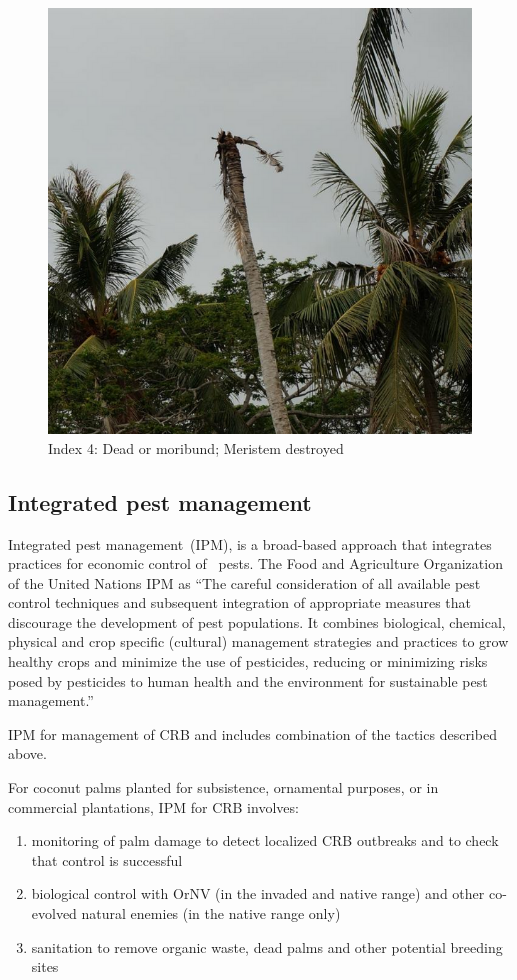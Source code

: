 \documentclass[twocolumn,letterpaper]{scrartcl}
\begin{document}
\begin{figure}[h!]
	\centering
	\includegraphics[width=.8\linewidth]{images/j5index4.resized.png}
	\caption{Index 4: Dead or moribund; Meristem destroyed}
	\label{fig:damage4}
\end{figure}

\newpage
\subsection{Integrated pest management}

Integrated pest management (IPM), is a broad-based approach that integrates practices for economic control of  pests.  The  Food and Agriculture Organization of the United Nations   IPM  as  “The careful consideration of all available pest control techniques and subsequent integration of appropriate measures that discourage the development of pest populations. It combines biological, chemical, physical and crop specific (cultural) management strategies and practices to grow healthy crops and minimize the use of pesticides, reducing or minimizing risks posed by pesticides to human health and the environment for sustainable pest management.”

IPM for management of CRB and includes combination of the tactics described above. 

For coconut palms planted for subsistence, ornamental purposes, or in commercial plantations, IPM for CRB involves: 
\begin{enumerate}
	\item monitoring of palm damage to detect localized CRB outbreaks and to check that control is successful
	\item biological control with OrNV (in the invaded and native range) and other co-evolved natural enemies (in the native range only)
	\item sanitation to remove organic waste, dead palms and  other  potential  breeding  sites
\end{enumerate}
\end{document}
